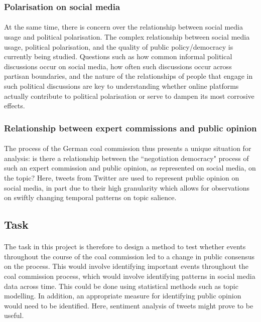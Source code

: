 \documentclass[10pt,twocolumn,letterpaper]{article}
\begin{document}
\subsubsection{Polarisation on social media}
\paragraph{} At the same time, there is concern over the relationship between social media usage and political polarisation. The complex relationship between social media usage, political polarisation, and the quality of public policy/democracy is currently being studied. Questions such as how common informal political discussions occur on social media, how often such discussions occur across partisan boundaries, and the nature of the relationships of people that engage in such political discussions are key to understanding whether online platforms actually contribute to political polarisation or serve to dampen its most corrosive effects. \cite{Tucker2019}

\subsubsection{Relationship between expert commissions and public opinion}
\paragraph{} The process of the German coal commission thus presents a unique situation for analysis: is there a relationship between the ``negotiation democracy" process of such an expert commission and public opinion, as represented on social media, on the topic? Here, tweets from Twitter are used to represent public opinion on social media, in part due to their high granularity which allows for observations on swiftly changing temporal patterns on topic salience. 

\subsection{Task}

\paragraph{} The task in this project is therefore to design a method to test whether events throughout the course of the coal commission led to a change in public consensus on the process. This would involve identifying important events throughout the coal commission process, which would involve identifying patterns in social media data across time. This could be done using statistical methods such as topic modelling. In addition, an appropriate measure for identifying public opinion would need to be identified. Here, sentiment analysis of tweets might prove to be useful.
\end{document}
